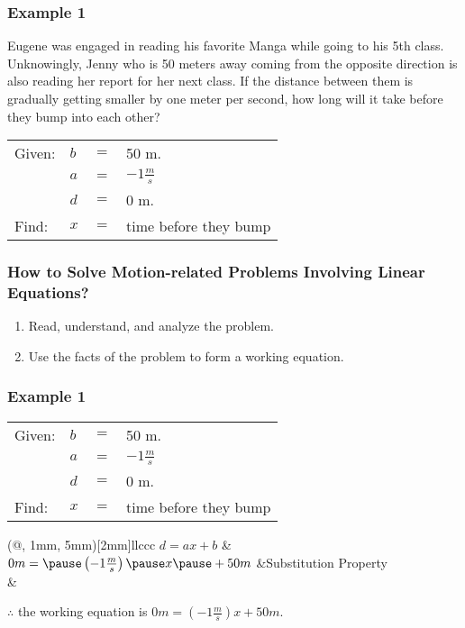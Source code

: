 \documentclass[14pt]{beamer}
\begin{document}
   \begin{frame}
   	\frametitle{Example 1}
   	\small Eugene was engaged in reading his favorite Manga while going to his 5th class.
   	Unknowingly, Jenny who is 50 meters away coming from the opposite direction is also reading her report for her next class. If the distance between them is gradually getting smaller by one meter per second, how long will it take before they bump into each other?
   	
   	\vone
   	\normalsize
   	\begin{tabular}{llll}
   		Given: & \pause $ b $ & $ = $ & 50 m. \\
   		 & \pause $ a $ & $ = $ & $ -1 \frac{m}{s}$ \\
   		 & \pause $ d $ & $ = $ & 0 m. \\
   		\pause Find: & $ x $ & $ = $ & time before they bump \\  
   	\end{tabular}
   \end{frame}  

    \begin{frame}
    	\frametitle{How  to Solve Motion-related Problems Involving Linear Equations?}
    	
    	\begin{enumerate}  
    		\item Read, understand, and analyze the problem. 
    		\item Use the facts of the problem to form a working equation.
    	\end{enumerate}  
    \end{frame}

    \begin{frame}
    	\frametitle{Example 1}
    	\begin{tabular}{llll}
    		Given: &  $ b $ & $ = $ & 50 m. \\
    		&  $ a $ & $ = $ & $ -1 \frac{m}{s}$ \\
    		&  $ d $ & $ = $ & 0 m. \\
    		 Find: & $ x $ & $ = $ & time before they bump \\  
    	\end{tabular}
    
        \begin{TAB}(@, 1mm, 5mm)[2mm]{ll}{ccc}
        	\pause $ d = ax + b $ &  \\
        	
        	\pause $ 0 m = \pause \left(-1 \frac{m}{s}\right)\pause x \pause + 50 m $  &\pause Substitution Property \\
        	& \\
        \end{TAB}
        
       \pause $ \therefore $ the working equation is $ 0 m = \left(-1 \frac{m}{s} \right) x + 50 m $.
    \end{frame}  
\end{document}
